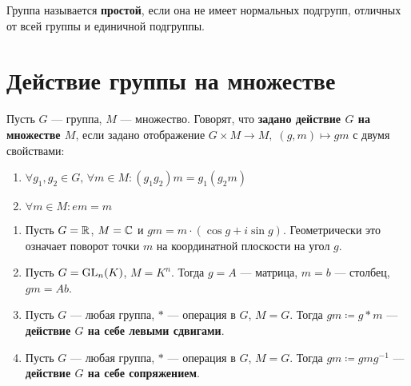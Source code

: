 \documentclass[../main.tex]{subfiles}
\begin{document}
\begin{definition}
  Группа называется \textbf{простой}, если она не имеет нормальных подгрупп, отличных от всей группы и единичной подгруппы.
\end{definition}

\section{Действие группы на множестве}
\begin{definition}
\label{def:6.20}
  Пусть $G$ --- группа, $M$ --- множество. Говорят, что \textbf{задано действие $G$ на множестве $M$}, если задано отображение $G \times M \to M, \; (g, m) \mapsto gm$ с двумя свойствами:
  \begin{enumerate}
    \item $\forall g_1, g_2 \in G, \, \forall m \in M\colon (g_1g_2)m = g_1(g_2m)$
    \item $\forall m \in M\colon em = m$
  \end{enumerate}
\end{definition}
\begin{examples}
\label{ex:6.20}
  \begin{enumerate}
    \item Пусть $G = \mathbb{R}$, $M = \mathbb{C}$ и $gm = m \cdot (\cos g + i \sin g)$. Геометрически это означает поворот точки $m$ на координатной плоскости на угол $g$.
    \item Пусть $G = \operatorname{GL}_n(K)$, $M = K^n$. Тогда $g = A$ --- матрица, $m = b$ --- столбец, $gm = Ab$.
    \item Пусть $G$ --- любая группа, $*$ --- операция в $G$, $M = G$. Тогда $gm \coloneqq g * m$ --- \textbf{действие $G$ на себе левыми сдвигами}.
    \item Пусть $G$ --- любая группа, $*$ --- операция в $G$, $M = G$. Тогда $gm \coloneqq gmg^{-1}$ --- \textbf{действие $G$ на себе сопряжением}.
  \end{enumerate}
\end{examples}
\end{document}
